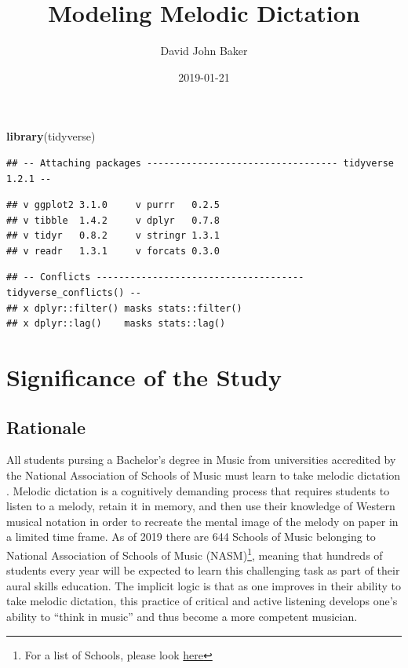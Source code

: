 \documentclass[]{book}
\title{Modeling Melodic Dictation}
\author{David John Baker}
\date{2019-01-21}
\newenvironment{Shaded}{\begin{snugshade}}{\end{snugshade}}
\newcommand{\KeywordTok}[1]{\textcolor[rgb]{0.13,0.29,0.53}{\textbf{#1}}}
\newcommand{\NormalTok}[1]{#1}
\let\rmarkdownfootnote\footnote%
\def\footnote{\protect\rmarkdownfootnote}
\begin{document}
\maketitle

{
\setcounter{tocdepth}{1}
\tableofcontents
}
\begin{Shaded}
\begin{Highlighting}[]
\KeywordTok{library}\NormalTok{(tidyverse)}
\end{Highlighting}
\end{Shaded}

\begin{verbatim}
## -- Attaching packages ---------------------------------- tidyverse 1.2.1 --
\end{verbatim}

\begin{verbatim}
## v ggplot2 3.1.0     v purrr   0.2.5
## v tibble  1.4.2     v dplyr   0.7.8
## v tidyr   0.8.2     v stringr 1.3.1
## v readr   1.3.1     v forcats 0.3.0
\end{verbatim}

\begin{verbatim}
## -- Conflicts ------------------------------------- tidyverse_conflicts() --
## x dplyr::filter() masks stats::filter()
## x dplyr::lag()    masks stats::lag()
\end{verbatim}

\hypertarget{significance-of-the-study}{%
\chapter{Significance of the Study}\label{significance-of-the-study}}

\hypertarget{rationale}{%
\section{Rationale}\label{rationale}}

All students pursing a Bachelor's degree in Music from universities accredited by the National Association of Schools of Music must learn to take melodic dictation \citep[§VIII.6.B.2.A]{NationalAssociationSchools2018}.
Melodic dictation is a cognitively demanding process that requires students to listen to a melody, retain it in memory, and then use their knowledge of Western musical notation in order to recreate the mental image of the melody on paper in a limited time frame.
As of 2019 there are 644 Schools of Music belonging to National Association of Schools of Music (NASM)\footnote{For a list of Schools, please look \href{https://nasm.arts-accredit.org/directory-lists/accredited-institutions/search/?institutionname=\&city=\&state=\&country=\&search=true}{here}}, meaning that hundreds of students every year will be expected to learn this challenging task as part of their aural skills education.
The implicit logic is that as one improves in their ability to take melodic dictation, this practice of critical and active listening develops one's ability to ``think in music'' \citep{bestMusicCurriculaFuture1992, karpinskiAuralSkillsAcquisition2000} and thus become a more competent musician.
\end{document}
